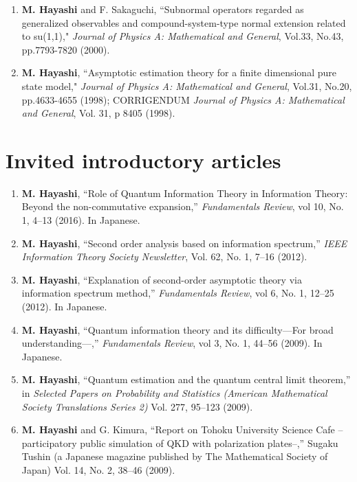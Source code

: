 \documentclass[a4paper,12pt,oneside]{article}
\begin{document}
\begin{enumerate}
\item
\textbf{M. Hayashi} and F. Sakaguchi, ``Subnormal operators regarded as generalized observables and compound-system-type normal extension related to su(1,1)," 
{\em Journal of Physics A: Mathematical and General}, Vol.33, No.43, pp.7793-7820 (2000).

\item
\textbf{M. Hayashi}, ``Asymptotic estimation theory for a finite dimensional pure state model," 
{\em Journal of Physics A: Mathematical and General}, Vol.31, No.20, pp.4633-4655 (1998); 
CORRIGENDUM {\em Journal of Physics A: Mathematical and General}, Vol. 31, p 8405 (1998).
\end{enumerate}

\section{Invited introductory articles}
\begin{enumerate}
\item 
\textbf{M. Hayashi},
``Role of Quantum Information Theory in Information Theory:
Beyond the non-commutative expansion,''
{\em Fundamentals Review}, vol 10, No. 1,  4--13 (2016). 
In Japanese. 


\item 
\textbf{M. Hayashi}, ``Second order analysis based on information spectrum,'' 
{\em IEEE Information Theory Society Newsletter}, Vol. 62, No. 1, 7--16 (2012). 

\item 
\textbf{M. Hayashi},
``Explanation of second-order asymptotic theory via information spectrum method,''
{\em Fundamentals Review}, vol 6, No. 1, 12--25 (2012). 
In Japanese. 

\item 
\textbf{M. Hayashi},
``Quantum information theory and its difficulty---For broad understanding---,''
{\em Fundamentals Review}, vol 3, No. 1, 44--56 (2009). 
In Japanese. 

\item 
\textbf{M. Hayashi}, 
``Quantum estimation and the quantum central limit theorem,'' 
in 
{\em Selected Papers on Probability and Statistics (American Mathematical Society Translations Series 2)} Vol. 277, 95--123 (2009). 

\item 
\textbf{M. Hayashi} and G. Kimura,
``Report on Tohoku University Science Cafe -- 
participatory public simulation of QKD with polarization plates--,'' 
Sugaku Tushin (a Japanese magazine published by The Mathematical Society of Japan)
Vol. 14, No. 2, 38--46 (2009).

\end{enumerate}
\end{document}
